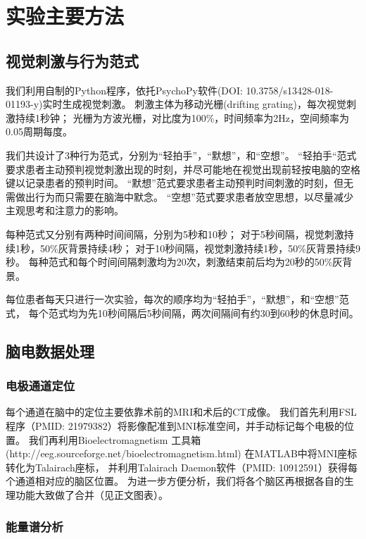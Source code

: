 \section{实验主要方法}

\subsection{视觉刺激与行为范式}

\indent 我们利用自制的Python程序，依托PsychoPy软件(DOI: 10.3758/s13428-018-01193-y)实时生成视觉刺激。
刺激主体为移动光栅(drifting grating)，每次视觉刺激持续1秒钟；
光栅为方波光栅，对比度为100\%，时间频率为2Hz，空间频率为0.05周期每度。

我们共设计了3种行为范式，分别为“轻拍手”，“默想”，和“空想”。
“轻拍手“范式要求患者主动预判视觉刺激出现的时刻，并尽可能地在视觉出现前轻按电脑的空格键以记录患者的预判时间。
“默想”范式要求患者主动预判时间刺激的时刻，但无需做出行为而只需要在脑海中默念。
“空想”范式要求患者放空思想，以尽量减少主观思考和注意力的影响。

每种范式又分别有两种时间间隔，分别为5秒和10秒；
对于5秒间隔，视觉刺激持续1秒，50\%灰背景持续4秒；
对于10秒间隔，视觉刺激持续1秒，50\%灰背景持续9秒。
每种范式和每个时间间隔刺激均为20次，刺激结束前后均为20秒的50\%灰背景。

每位患者每天只进行一次实验，每次的顺序均为“轻拍手”，“默想”，和“空想”范式，
每个范式均为先10秒间隔后5秒间隔，两次间隔间有约30到60秒的休息时间。

\subsection{脑电数据处理}

\subsubsection{电极通道定位}

每个通道在脑中的定位主要依靠术前的MRI和术后的CT成像。
我们首先利用FSL程序（PMID: 21979382）将影像配准到MNI标准空间，并手动标记每个电极的位置。
我们再利用Bioelectromagnetism 工具箱(http://eeg.sourceforge.net/bioelectromagnetism.html) 在MATLAB中将MNI座标转化为Talairach座标，
并利用Talairach Daemon软件（PMID: 10912591）获得每个通道相对应的脑区位置。
为进一步方便分析，我们将各个脑区再根据各自的生理功能大致做了合并（见正文图表）。

\subsubsection{能量谱分析}

